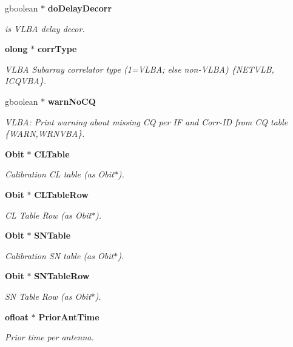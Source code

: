 \begin{CompactItemize}
gboolean $\ast$ {\bf do\-Delay\-Decorr}
\begin{CompactList}\small\item\em is VLBA delay decor. \item\end{CompactList}\item 
{\bf olong} $\ast$ {\bf corr\-Type}
\begin{CompactList}\small\item\em VLBA Subarray correlator type (1=VLBA; else non-VLBA) \{NETVLB, ICQVBA\}. \item\end{CompactList}\item 
gboolean $\ast$ {\bf warn\-No\-CQ}
\begin{CompactList}\small\item\em VLBA: Print warning about missing CQ per IF and Corr-ID from CQ table \{WARN,WRNVBA\}. \item\end{CompactList}\item 
{\bf Obit} $\ast$ {\bf CLTable}
\begin{CompactList}\small\item\em Calibration CL table (as Obit$\ast$). \item\end{CompactList}\item 
{\bf Obit} $\ast$ {\bf CLTable\-Row}
\begin{CompactList}\small\item\em CL Table Row (as Obit$\ast$). \item\end{CompactList}\item 
{\bf Obit} $\ast$ {\bf SNTable}
\begin{CompactList}\small\item\em Calibration SN table (as Obit$\ast$). \item\end{CompactList}\item 
{\bf Obit} $\ast$ {\bf SNTable\-Row}
\begin{CompactList}\small\item\em SN Table Row (as Obit$\ast$). \item\end{CompactList}\item 
{\bf ofloat} $\ast$ {\bf Prior\-Ant\-Time}
\begin{CompactList}\small\item\em Prior time per antenna. \item\end{CompactList}\item 

\end{CompactItemize}
